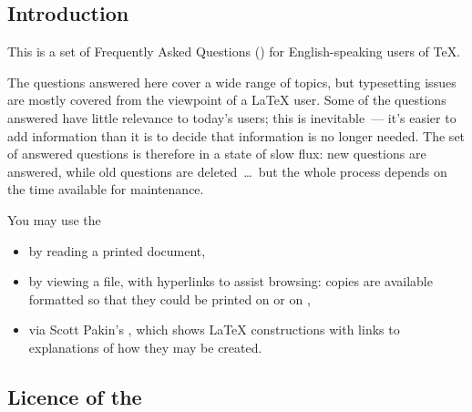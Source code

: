 
\begin{introduction}
\section{Introduction}

This is a set of Frequently Asked Questions () for
English-speaking users of \TeX{}.

The questions answered here cover a wide range of topics, but
typesetting issues are mostly covered from the viewpoint of a \LaTeX{}
user.  Some of the questions answered have little relevance to today's
users; this is inevitable~--- it's easier to add information than it
is to decide that information is no longer needed.  The set of
answered questions is therefore in a state of slow flux: new questions
are answered, while old questions are deleted~\dots{}~but the whole
process depends on the time available for  maintenance.

\nothtml{\noindent} You may use the 
\begin{itemize}
\item by reading a printed document,
\item by viewing a  file, with hyperlinks to assist
  browsing: copies are available formatted so that they could be
  printed on  or on %
  , 
\item via Scott Pakin's , which shows
  \LaTeX{} constructions with links to  explanations of how
  they may be created.
\end{itemize}

\subsection{Licence of the }


\end{introduction}

